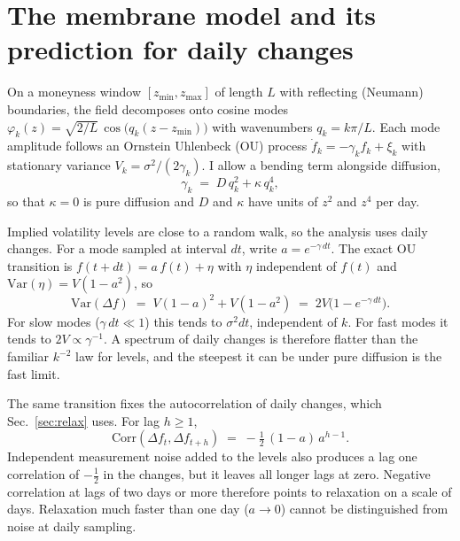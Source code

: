 \documentclass[11pt]{article}
\begin{document}
\section{The membrane model and its prediction for daily changes}
\label{sec:theory}

On a moneyness window $[z_{\min},z_{\max}]$ of length $L$ with reflecting (Neumann) boundaries, the field decomposes onto cosine modes $\varphi_k(z)=\sqrt{2/L}\,\cos\!\big(q_k(z-z_{\min})\big)$ with wavenumbers $q_k=k\pi/L$. Each mode amplitude follows an Ornstein Uhlenbeck (OU) process $\dot f_k=-\gamma_k f_k+\xi_k$ with stationary variance $V_k=\sigma^2/(2\gamma_k)$. I allow a bending term alongside diffusion,
\begin{equation}
\gamma_k \;=\; D\,q_k^{2} + \kappa\, q_k^{4},
\label{eq:operator}
\end{equation}
so that $\kappa=0$ is pure diffusion and $D$ and $\kappa$ have units of $z^2$ and $z^4$ per day.

Implied volatility levels are close to a random walk, so the analysis uses daily changes. For a mode sampled at interval $dt$, write $a=e^{-\gamma\,dt}$. The exact OU transition is $f(t+dt)=a\,f(t)+\eta$ with $\eta$ independent of $f(t)$ and $\mathrm{Var}(\eta)=V(1-a^2)$, so
\begin{equation}
\mathrm{Var}(\Delta f)\;=\;V(1-a)^2+V(1-a^2)\;=\;2V\big(1-e^{-\gamma\,dt}\big).
\label{eq:increment}
\end{equation}
For slow modes ($\gamma\,dt\ll1$) this tends to $\sigma^2 dt$, independent of $k$. For fast modes it tends to $2V\propto\gamma^{-1}$. A spectrum of daily changes is therefore flatter than the familiar $k^{-2}$ law for levels, and the steepest it can be under pure diffusion is the fast limit.

The same transition fixes the autocorrelation of daily changes, which Sec.~\ref{sec:relax} uses. For lag $h\ge1$,
\begin{equation}
\mathrm{Corr}(\Delta f_t,\Delta f_{t+h}) \;=\; -\tfrac12\,(1-a)\,a^{h-1}.
\label{eq:acf}
\end{equation}
Independent measurement noise added to the levels also produces a lag one correlation of $-\tfrac12$ in the changes, but it leaves all longer lags at zero. Negative correlation at lags of two days or more therefore points to relaxation on a scale of days. Relaxation much faster than one day ($a\to0$) cannot be distinguished from noise at daily sampling.
\end{document}

